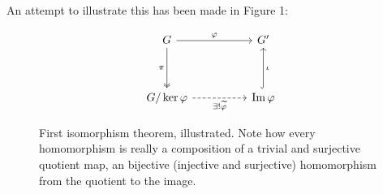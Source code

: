 An attempt to illustrate this has been made in Figure 1:

\begin{center}
\[\begin{tikzcd}
	G && {G'} \\
	\\
	{G/\ker \varphi} && {\operatorname{Im}\varphi}
	\arrow["\varphi", from=1-1, to=1-3]
	\arrow["\pi"', two heads, from=1-1, to=3-1]
	\arrow["{\exists ! \widetilde{\varphi}}"', dashed, from=3-1, to=3-3]
	\arrow["\iota"', hook, from=3-3, to=1-3]
\end{tikzcd}\]
\end{center}

\begin{figure}[htpb]
    \centering
    \caption{First isomorphism theorem, illustrated. Note how every homomorphism is really
    a composition of a trivial and surjective quotient map, an bijective (injective and
    surjective) homomorphism from the quotient to the image.} 
    \label{fig:isomorphism-theorem}
\end{figure}


